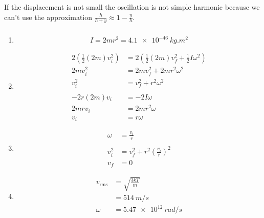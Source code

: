 \documentclass{article}
\begin{document}
\begin{enumerate}
        If the displacement is not small the oscillation is not simple harmonic because we can't use the approximation $\frac{h}{h + y} \approx 1 - \frac{y}{h}$.
\end{enumerate}

\setcounter{subsubsection}{80}
\subsubsection{}

\begin{enumerate}
  \item \[I = 2 m r^2 = \qty{4.1e-46}{kg.m^2}\]

  \item

        \begin{align*}
          2 \left( \frac{1}{2} (2 m) v_i^2 \right) & = 2 \left( \frac{1}{2} (2 m) v_f^2 + \frac{1}{2} I \omega^2 \right) \\
          2 m v_i^2                                & = 2 m v_f^2 + 2 m r^2 \omega^2                                      \\
          v_i^2                                    & = v_f^2 + r^2 \omega^2                                              \\ \\
          -2 r (2 m) v_i                           & = -2 I \omega                                                       \\
          2 m r v_i                                & = 2 m r^2 \omega                                                    \\
          v_i                                      & = r \omega
        \end{align*}

  \item

        \begin{align*}
          \omega & = \frac{v_i}{r}                              \\ \\
          v_i^2  & = v_f^2 + r^2 \left( \frac{v_i}{r} \right)^2 \\
          v_f    & = 0
        \end{align*}

  \item

        \begin{align*}
          v_\text{rms} & = \sqrt{\frac{3 k T}{m}} \\
                       & = \qty{514}{m/s}         \\
          \omega       & = \qty{5.47e12}{rad/s}   \\
        \end{align*}
\end{enumerate}
\end{document}
